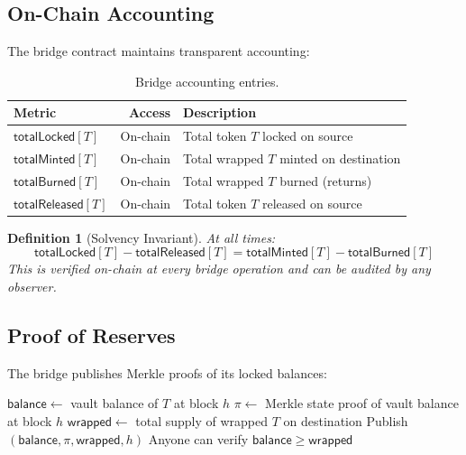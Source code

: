\documentclass[11pt,a4paper]{article}
\newtheorem{definition}{Definition}
\begin{document}
\subsection{On-Chain Accounting}

The bridge contract maintains transparent accounting:

\begin{table}[H]
\centering
\caption{Bridge accounting entries.}
\label{tab:accounting}
\begin{tabular}{lrl}
\toprule
\textbf{Metric} & \textbf{Access} & \textbf{Description} \\
\midrule
$\mathsf{totalLocked}[T]$ & On-chain & Total token $T$ locked on source \\
$\mathsf{totalMinted}[T]$ & On-chain & Total wrapped $T$ minted on destination \\
$\mathsf{totalBurned}[T]$ & On-chain & Total wrapped $T$ burned (returns) \\
$\mathsf{totalReleased}[T]$ & On-chain & Total token $T$ released on source \\
\bottomrule
\end{tabular}
\end{table}

\begin{definition}[Solvency Invariant]
At all times:
\begin{equation}
    \mathsf{totalLocked}[T] - \mathsf{totalReleased}[T] = \mathsf{totalMinted}[T] - \mathsf{totalBurned}[T]
\end{equation}
This is verified on-chain at every bridge operation and can be audited by any observer.
\end{definition}

\subsection{Proof of Reserves}

The bridge publishes Merkle proofs of its locked balances:

\begin{algorithm}[H]
\caption{Proof of Reserves}
\label{alg:reserves}
\begin{algorithmic}[1]
    \State $\mathsf{balance} \gets$ vault balance of $T$ at block $h$
    \State $\pi \gets$ Merkle state proof of vault balance at block $h$
    \State $\mathsf{wrapped} \gets$ total supply of wrapped $T$ on destination
    \State Publish $(\mathsf{balance}, \pi, \mathsf{wrapped}, h)$
    \State Anyone can verify $\mathsf{balance} \geq \mathsf{wrapped}$
\EndProcedure
\end{algorithmic}
\end{algorithm}
\end{document}
